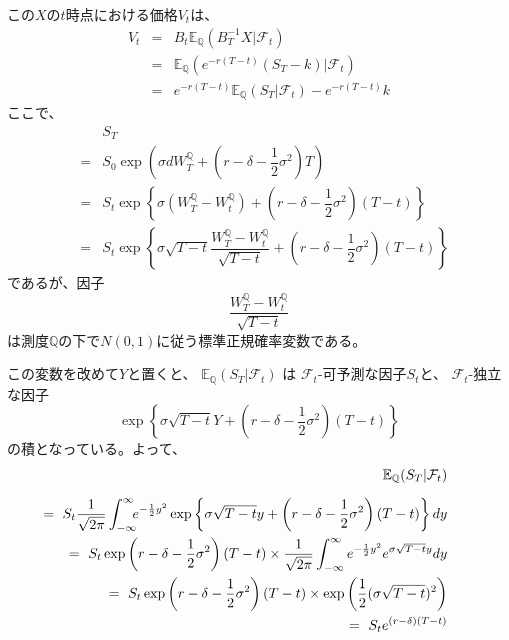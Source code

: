\documentclass[uplatex,a4j,12pt,dvipdfmx]{jsarticle}
\begin{document}
この$X$の$t$時点における価格$V_{t}$は、
%
%
\begin{eqnarray*}
	V_{t}
	&=&
	B_{t}
	\mathbb{E}_{\mathbb{Q}} ( B^{-1}_{T} X | \mathcal{F}_{t} )
	\\ &=&
	\mathbb{E}_{\mathbb{Q}} ( e^{-r(T-t)} (S_{T} - k) | \mathcal{F}_{t} )
	\\ &=&
	e^{-r(T-t)} \mathbb{E}_{\mathbb{Q}} ( S_{T}  | \mathcal{F}_{t} ) - e^{-r(T-t)} k
\end{eqnarray*}
%
%
ここで、
%
%
\begin{eqnarray*}
	&&
	S_{T}
	\\ &=&
	S_{0}
	\exp
	\left(
	\sigma d W^{\mathbb{Q}}_{T}
	+
	\left(
	r
	- \delta
	- \dfrac{1}{2} \sigma^{2}
	\right)
	T
	\right)
	\\ &=&
	S_{t}
	\exp
	\left\{
	\sigma ( W^{\mathbb{Q}}_{T} - W^{\mathbb{Q}}_{t} )
	+
	\left(
	r
	- \delta
	- \dfrac{1}{2} \sigma^{2}
	\right)
	(T-t)
	\right\}
	\\ &=&
	S_{t}
	\exp
	\left\{
	\sigma \sqrt{T-t}
	\dfrac{ W^{\mathbb{Q}}_{T} - W^{\mathbb{Q}}_{t} }
	{\sqrt{T-t}}
	+
	\left(
	r
	- \delta
	- \dfrac{1}{2} \sigma^{2}
	\right)
	(T-t)
	\right\}
\end{eqnarray*}
%
%
であるが、因子
$$
	\dfrac{ W^{\mathbb{Q}}_{T} - W^{\mathbb{Q}}_{t} }
	{\sqrt{T-t}}
$$
は測度$\mathbb{Q}$の下で$N(0,1)$に従う標準正規確率変数である。

この変数を改めて$Y$と置くと、
$\mathbb{E}_{\mathbb{Q}} ( S_{T}  | \mathcal{F}_{t} )$
は
$\mathcal{F}_{t}$-可予測な因子$S_{t}$と、
$\mathcal{F}_{t}$-独立な因子
$$
	\exp
	\left\{
	\sigma \sqrt{T-t}
	Y
	+
	\left(
	r
	- \delta
	- \dfrac{1}{2} \sigma^{2}
	\right)
	(T-t)
	\right\}
$$
の積となっている。よって、
%
%
\begin{eqnarray*}
	&&
	\hspace{-10mm}
	\mathbb{E}_{\mathbb{Q}} ( S_{T}  | \mathcal{F}_{t} )
	\\[2mm] &&
	\hspace{-10mm}
	= \
	S_{t}
	\dfrac{1}{\sqrt{2\pi}}
	\int^{\infty}_{-\infty}
	\!\!\!
	e^{-\frac{1}{2} y^{2}}
	\exp
	\left\{
	\sigma \sqrt{T-t}
	y
	+
	\left(
	r
	- \delta
	- \dfrac{1}{2} \sigma^{2}
	\right)
	(T-t)
	\right\}
	dy
	\\ &&
	\hspace{-10mm}
	= \
	S_{t}
	\exp
	\left(
	r
	- \delta
	- \dfrac{1}{2} \sigma^{2}
	\right)
	(T-t)
	\times
	\dfrac{1}{\sqrt{2\pi}}
	\int^{\infty}_{-\infty}
	e^{-\frac{1}{2} y^{2}}
	e^{\sigma \sqrt{T-t} y}
	dy
	\\ &&
	\hspace{-10mm}
	= \
	S_{t}
	\exp
	\left(
	r
	- \delta
	- \dfrac{1}{2} \sigma^{2}
	\right)
	(T-t)
	\times
	\exp
	\left(
	\dfrac{1}{2} (\sigma \sqrt{T-t})^{2}
	\right)
	\\ &&
	\hspace{-10mm}
	= \
	S_{t} e^{(r-\delta)(T-t)}
\end{eqnarray*}
%
%
\end{document}

